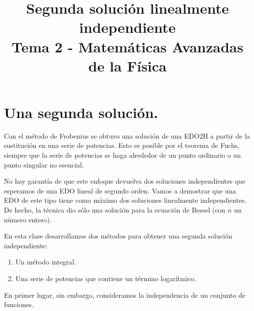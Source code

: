 
\title{Segunda solución linealmente independiente \\ \large {Tema 2 - Matemáticas Avanzadas de la Física}\vspace{-1.5\baselineskip}}
\date{}
\author{}

\maketitle
\fontsize{14}{14}\selectfont
\section{Una segunda solución.}
Con el método de Frobenius se obtuvo una solución de una EDO2H a partir de la sustitución en una serie de potencias. Esto es posible por el teorema de Fuchs, siempre que la serie de potencias se haga alrededor de un punto ordinario o un punto singular no esencial.
\par
No hay garantía de que este enfoque devuelva dos soluciones independientes que esperamos de una EDO lineal de segundo orden. Vamos a demostrar que una EDO de este tipo tiene como máximo dos soluciones linealmente independientes. De hecho, la técnica dio sólo una solución para la ecuación de Bessel (con $n$ un número entero).
\par
En esta clase desarrollamos dos métodos para obtener una segunda solución independiente:
\begin{enumerate}
\item Un método integral.
\item Una serie de potencias que contiene un término logarítmico.
\end{enumerate}
En primer lugar, sin embargo, consideramos la independencia de un conjunto de funciones.
